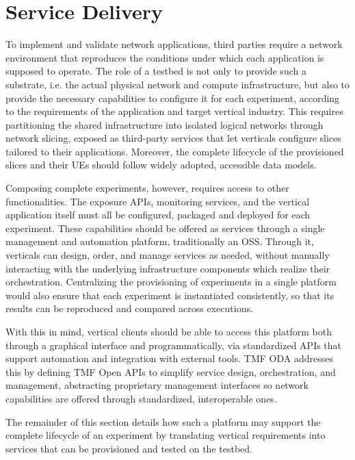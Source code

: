 \section{Service Delivery}
\label{chap:proposal:delivery}

To implement and validate network applications, third parties require a network environment that reproduces the conditions under which each application is supposed to operate. The role of a testbed is not only to provide such a substrate, i.e. the actual physical network and compute infrastructure, but also to provide the necessary capabilities to configure it for each experiment, according to the requirements of the application and target vertical industry. This requires partitioning the shared infrastructure into isolated logical networks through network slicing, exposed as third-party services that let verticals configure slices tailored to their applications. Moreover, the complete lifecycle of the provisioned slices and their \acsp{UE} should follow widely adopted, accessible data models.

Composing complete experiments, however, requires access to other functionalities. The exposure \acsp{API}, monitoring services, and the vertical application itself must all be configured, packaged and deployed for each experiment. These capabilities should be offered as services through a single management and automation platform, traditionally an \acs{OSS}. Through it, verticals can design, order, and manage services as needed, without manually interacting with the underlying infrastructure components which realize their orchestration. Centralizing the provisioning of experiments in a single platform would also ensure that each experiment is instantiated consistently, so that its results can be reproduced and compared across executions.

With this in mind, vertical clients should be able to access this platform both through a graphical interface and programmatically, via standardized \acsp{API} that support automation and integration with external tools. \acs{TMF} \acs{ODA} addresses this by defining \acs{TMF} Open \acsp{API} to simplify service design, orchestration, and management, abstracting proprietary management interfaces so network capabilities are offered through standardized, interoperable ones.

The remainder of this section details how such a platform may support the complete lifecycle of an experiment by translating vertical requirements into services that can be provisioned and tested on the testbed.



